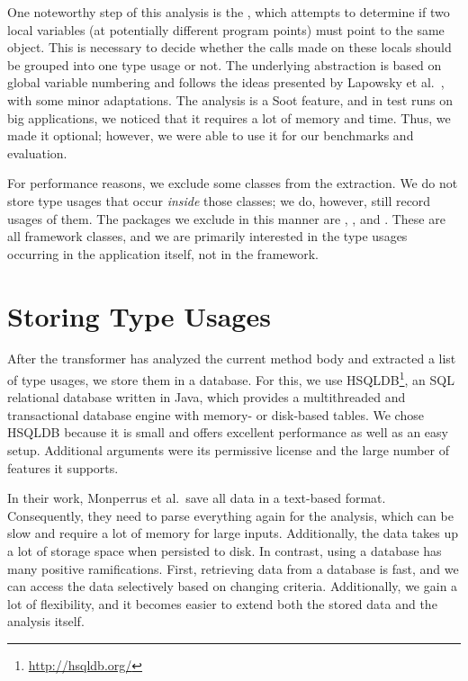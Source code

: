 One noteworthy step of this analysis is the , which attempts to determine if two local variables (at potentially different program points) must point to the same object.
This is necessary to decide whether the calls made on these locals should be grouped into one type usage or not.
The underlying abstraction is based on global variable numbering and follows the ideas presented by Lapowsky et al.~\cite{lapkowski1998extended}, with some minor adaptations.
The analysis is a Soot feature, and in test runs on big applications, we noticed that it requires a lot of memory and time.
Thus, we made it optional; however, we were able to use it for our benchmarks and evaluation.

For performance reasons, we exclude some classes from the extraction.
We do not store type usages that occur \emph{inside} those classes; we do, however, still record usages of them.
The packages we exclude in this manner are , ,  and  .
These are all framework classes, and we are primarily interested in the type usages occurring in the application itself, not in the framework.

\section{Storing Type Usages}

After the transformer has analyzed the current method body and extracted a list of type usages, we store them in a database.
For this, we use HSQLDB\footnote{\url{http://hsqldb.org/}}, an SQL relational database written in Java, which provides a multithreaded and transactional database engine with memory- or disk-based tables.
We chose HSQLDB because it is small and offers excellent performance as well as an easy setup.
Additional arguments were its permissive license and the large number of features it supports.

In their work, Monperrus et al.\ save all data in a text-based format.
Consequently, they need to parse everything again for the analysis, which can be slow and require a lot of memory for large inputs.
Additionally, the data takes up a lot of storage space when persisted to disk.
In contrast, using a database has many positive ramifications.
First, retrieving data from a database is fast, and we can access the data selectively based on changing criteria.
Additionally, we gain a lot of flexibility, and it becomes easier to extend both the stored data and the analysis itself.

